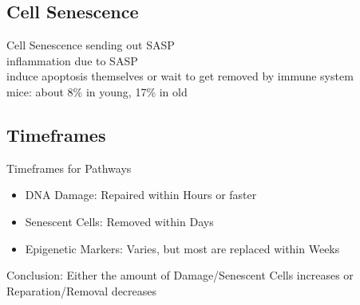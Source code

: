 \subsection{Cell Senescence}

\begin{frame}[c]{Cell Senescence}
    sending out SASP \\
    inflammation due to SASP \\
    induce apoptosis themselves or wait to get removed by immune system \\
    mice: about 8\% in young, 17\% in old \cite{folgueras2018mouse} \\
\end{frame}


\subsection{Timeframes}

\begin{frame}[c]{Timeframes for Pathways}
    \large
    \begin{itemize}[<+(1)->]
        \item DNA Damage: Repaired within Hours or faster \cite{frankenberg1989review}
        \item Senescent Cells: Removed within Days \cite{karin2018senescent}
        \item Epigenetic Markers: Varies, but most are replaced within Weeks \cite{ginno2020genome} \cite{yamagata2012rapid}
    \end{itemize}
    \pause
    Conclusion: Either the amount of Damage/Senescent Cells increases or Reparation/Removal decreases
\end{frame}



\backupend
